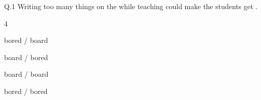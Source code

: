 \iffalse
\chapter{2022}
\author{EE24BTECH11059}
\section{ae}
\fi
	\item{
		Q.1 Writing too many things on the \underline{ \hspace{1.5cm}} while teaching could make the students get \underline{ \hspace{1.5cm}     }.
		\begin{enumerate}
		\end{enumerate}
	}
